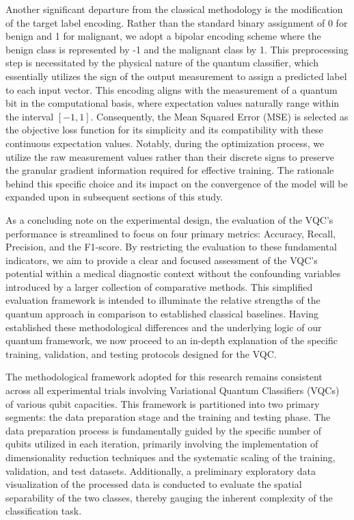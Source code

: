 \documentclass[en]{dimscthesis}
\begin{document}
Another significant departure from the classical methodology is the modification of the target label encoding. Rather than the standard binary assignment of 0 for benign and 1 for malignant, we adopt a bipolar encoding scheme where the benign class is represented by -1 and the malignant class by 1. This preprocessing step is necessitated by the physical nature of the quantum classifier, which essentially utilizes the sign of the output measurement to assign a predicted label to each input vector. This encoding aligns with the measurement of a quantum bit in the computational basis, where expectation values naturally range within the interval $[-1, 1]$. Consequently, the Mean Squared Error (MSE) is selected as the objective loss function for its simplicity and its compatibility with these continuous expectation values. Notably, during the optimization process, we utilize the raw measurement values rather than their discrete signs to preserve the granular gradient information required for effective training. The rationale behind this specific choice and its impact on the convergence of the model will be expanded upon in subsequent sections of this study.

As a concluding note on the experimental design, the evaluation of the VQC’s performance is streamlined to focus on four primary metrics: Accuracy, Recall, Precision, and the F1-score. By restricting the evaluation to these fundamental indicators, we aim to provide a clear and focused assessment of the VQC’s potential within a medical diagnostic context without the confounding variables introduced by a larger collection of comparative methods. This simplified evaluation framework is intended to illuminate the relative strengths of the quantum approach in comparison to established classical baselines. Having established these methodological differences and the underlying logic of our quantum framework, we now proceed to an in-depth explanation of the specific training, validation, and testing protocols designed for the VQC.

The methodological framework adopted for this research remains consistent across all experimental trials involving Variational Quantum Classifiers (VQCs) of various qubit capacities. This framework is partitioned into two primary segments: the data preparation stage and the training and testing phase. The data preparation process is fundamentally guided by the specific number of qubits utilized in each iteration, primarily involving the implementation of dimensionality reduction techniques and the systematic scaling of the training, validation, and test datasets. Additionally, a preliminary exploratory data visualization of the processed data is conducted to evaluate the spatial separability of the two classes, thereby gauging the inherent complexity of the classification task.
\end{document}
